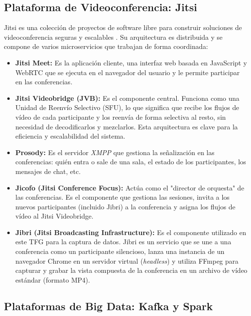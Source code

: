 \subsection{Plataforma de Videoconferencia: Jitsi}
Jitsi es una colección de proyectos de software libre para construir soluciones de videoconferencia seguras y escalables \cite{JitsiJibriDocs}. Su arquitectura es distribuida y se compone de varios microservicios que trabajan de forma coordinada:
\begin{itemize}
    \item \textbf{Jitsi Meet:} Es la aplicación cliente, una interfaz web basada en JavaScript y WebRTC que se ejecuta en el navegador del usuario y le permite participar en las conferencias.
    \item \textbf{Jitsi Videobridge (JVB):} Es el componente central. Funciona como una Unidad de Reenvío Selectivo (SFU), lo que significa que recibe los flujos de vídeo de cada participante y los reenvía de forma selectiva al resto, sin necesidad de decodificarlos y mezclarlos. Esta arquitectura es clave para la eficiencia y escalabilidad del sistema.
    \item \textbf{Prosody:} Es el servidor \textit{XMPP} que gestiona la señalización en las conferencias: quién entra o sale de una sala, el estado de los participantes, los mensajes de chat, etc.
    \item \textbf{Jicofo (Jitsi Conference Focus):} Actúa como el "director de orquesta" de las conferencias. Es el componente que gestiona las sesiones, invita a los nuevos participantes (incluido Jibri) a la conferencia y asigna los flujos de vídeo al Jitsi Videobridge.
    \item \textbf{Jibri (Jitsi Broadcasting Infrastructure):} Es el componente utilizado en este TFG para la captura de datos. Jibri es un servicio que se une a una conferencia como un participante silencioso, lanza una instancia de un navegador Chrome en un servidor virtual (\textit{headless}) y utiliza FFmpeg para capturar y grabar la vista compuesta de la conferencia en un archivo de vídeo estándar (formato MP4).
\end{itemize}

\subsection{Plataformas de Big Data: Kafka y Spark}
